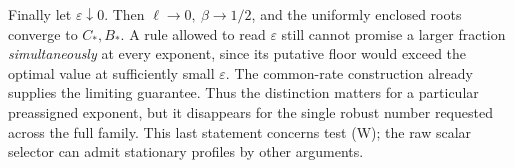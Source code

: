 Finally let \(\varepsilon\downarrow0\). Then \(\ell\to0,\ \beta\to1/2\), and the uniformly enclosed roots converge to \(C_*,B_*\). A rule allowed to read \(\varepsilon\) still cannot promise a larger fraction \emph{simultaneously} at every exponent, since its putative floor would exceed the optimal value at sufficiently small \(\varepsilon\). The common-rate construction already supplies the limiting guarantee. Thus the distinction matters for a particular preassigned exponent, but it disappears for the single robust number requested across the full family. This last statement concerns test (W); the raw scalar selector can admit stationary profiles by other arguments.
